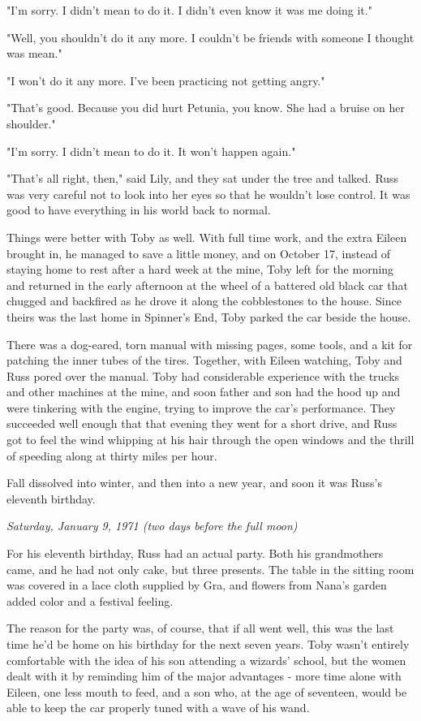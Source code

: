 \documentclass[a4paper,11pt]{article}
\begin{document}
"I'm sorry. I didn't mean to do it. I didn't even know it was me doing it."

"Well, you shouldn't do it any more. I couldn't be friends with someone I thought was mean."

"I won't do it any more. I've been practicing not getting angry."

"That's good. Because you did hurt Petunia, you know. She had a bruise on her shoulder."

"I'm sorry. I didn't mean to do it. It won't happen again."

"That's all right, then," said Lily, and they sat under the tree and talked. Russ was very careful not to look into her eyes so that he wouldn't lose control. It was good to have everything in his world back to normal.

Things were better with Toby as well. With full time work, and the extra Eileen brought in, he managed to save a little money, and on October 17, instead of staying home to rest after a hard week at the mine, Toby left for the morning and returned in the early afternoon at the wheel of a battered old black car that chugged and backfired as he drove it along the cobblestones to the house. Since theirs was the last home in Spinner's End, Toby parked the car beside the house.

There was a dog-eared, torn manual with missing pages, some tools, and a kit for patching the inner tubes of the tires. Together, with Eileen watching, Toby and Russ pored over the manual. Toby had considerable experience with the trucks and other machines at the mine, and soon father and son had the hood up and were tinkering with the engine, trying to improve the car's performance. They succeeded well enough that that evening they went for a short drive, and Russ got to feel the wind whipping at his hair through the open windows and the thrill of speeding along at thirty miles per hour.

Fall dissolved into winter, and then into a new year, and soon it was Russ's eleventh birthday.

\emph{Saturday, January 9, 1971 (two days before the full moon)}

For his eleventh birthday, Russ had an actual party. Both his grandmothers came, and he had not only cake, but three presents. The table in the sitting room was covered in a lace cloth supplied by Gra, and flowers from Nana's garden added color and a festival feeling.

The reason for the party was, of course, that if all went well, this was the last time he'd be home on his birthday for the next seven years. Toby wasn't entirely comfortable with the idea of his son attending a wizards' school, but the women dealt with it by reminding him of the major advantages - more time alone with Eileen, one less mouth to feed, and a son who, at the age of seventeen, would be able to keep the car properly tuned with a wave of his wand.
\end{document}
